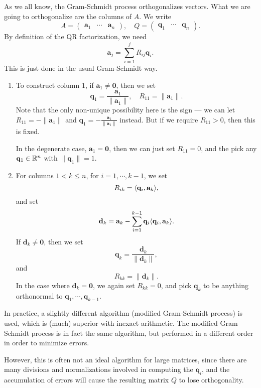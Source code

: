 \documentclass[a4paper]{article}
\begin{document}
As we all know, the Gram-Schmidt process orthogonalizes vectors. What we are going to orthogonalize are the columns of $A$. We write
\[
  A =
  \begin{pmatrix}
    \mathbf{a}_1 & \cdots & \mathbf{a}_n
  \end{pmatrix},\quad
  Q =
  \begin{pmatrix}
    \mathbf{q}_1 & \cdots & \mathbf{q}_n
  \end{pmatrix}.
\]
By definition of the QR factorization, we need
\[
  \mathbf{a}_j = \sum_{i = 1}^j R_{ij} \mathbf{q}_i.
\]
This is just done in the usual Gram-Schmidt way.
\begin{enumerate}
  \item To construct column $1$, if $\mathbf{a}_1 \not= \mathbf{0}$, then we set
    \[
      \mathbf{q}_1 = \frac{\mathbf{a}_1}{\|\mathbf{a}_1\|},\quad R_{11} = \|\mathbf{a}_1\|.
    \]
    Note that the only non-unique possibility here is the sign --- we can let $R_{11} = - \|\mathbf{a}_1\|$ and $\mathbf{q}_1 = -\frac{\mathbf{a}_1}{\|\mathbf{a}_1\|}$ instead. But if we require $R_{11} > 0$, then this is fixed.

    In the degenerate case, $\mathbf{a}_1 = \mathbf{0}$, then we can just set $R_{11} = 0$, and the pick any $\mathbf{q}_1 \in \mathbb{R}^n$ with $\|\mathbf{q}_1\| = 1$.
  \item For columns $1 < k \leq n$, for $i = 1, \cdots, k - 1$, we set
    \[
      R_{ik} = \langle \mathbf{q}_i, \mathbf{a}_k\rangle,
    \]
    and set
    \[
      \mathbf{d}_k = \mathbf{a}_k - \sum_{i = 1}^{k - 1} \mathbf{q}_i \langle \mathbf{q}_i, \mathbf{a}_k\rangle.
    \]
    If $\mathbf{d}_k \not= \mathbf{0}$, then we set
    \[
      \mathbf{q}_k = \frac{\mathbf{d}_k}{\|\mathbf{d}_k\|},
    \]
    and
    \[
      R_{kk} = \|\mathbf{d}_k\|.
    \]
    In the case where $\mathbf{d}_k = \mathbf{0}$, we again set $R_{kk} = 0$, and pick $\mathbf{q}_k$ to be anything orthonormal to $\mathbf{q}_1, \cdots, \mathbf{q}_{k - 1}$.
\end{enumerate}

In practice, a slightly different algorithm (modified Gram-Schmidt process) is used, which is (much) superior with inexact arithmetic. The modified Gram-Schmidt process is in fact the same algorithm, but performed in a different order in order to minimize errors.

However, this is often not an ideal algorithm for large matrices, since there are many divisions and normalizations involved in computing the $\mathbf{q}_i$, and the accumulation of errors will cause the resulting matrix $Q$ to lose orthogonality.
\end{document}
